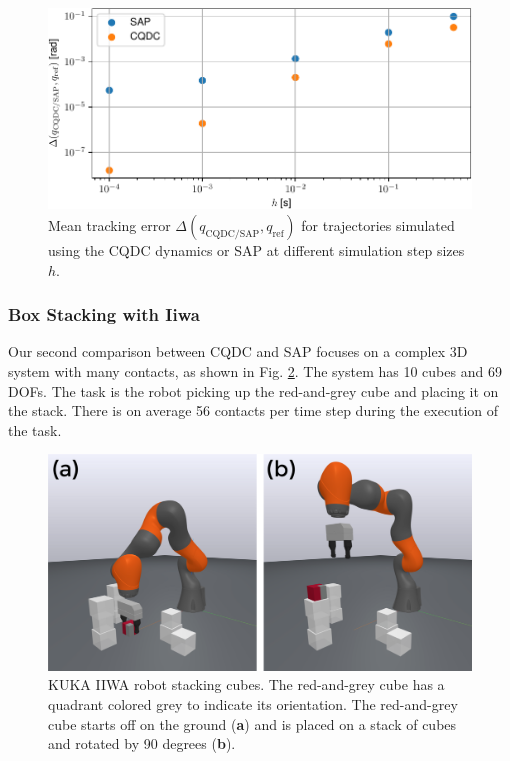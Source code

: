\begin{figure}[h]
\centering
\includegraphics[width=0.8\linewidth]{figures/02_quasi_static_dynamics/iiwa_trajectory_tracking_error_vs_time_step.pdf}
\caption{Mean tracking error $\Delta(q_\mathrm{CQDC/SAP}, q_\mathrm{ref})$ for trajectories simulated using the CQDC dynamics or SAP at different simulation step sizes $h$.}
\label{fig:iiwa_trajectory_tracking_error_vs_time_step}
\end{figure}


\subsubsection{Box Stacking with Iiwa}
Our second comparison between CQDC and SAP focuses on a complex 3D system with many contacts, as shown in Fig. \ref{fig:iiwa_cube_stacking}. The system has 10 cubes and 69 DOFs. The task is the robot picking up the red-and-grey cube and placing it on the stack. There is on average 56 contacts per time step during the execution of the task.
\begin{figure}
\centering
\includegraphics[width=0.75\linewidth]{figures/02_quasi_static_dynamics/start_and_final_configurations.png}
\caption{KUKA IIWA robot stacking cubes. The red-and-grey cube has a quadrant colored grey to indicate its orientation. The red-and-grey cube starts off on the ground (\textbf{a}) and is placed on a stack of cubes and rotated by 90 degrees (\textbf{b}).}
\label{fig:iiwa_cube_stacking}
\end{figure}

